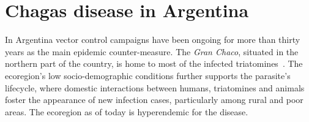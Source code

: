 \section{Chagas disease in Argentina}

In Argentina vector control campaigns have been ongoing for more than thirty years as the main epidemic counter-measure. The \textit{Gran Chaco}, situated in the northern part of the country, is home to most of the infected triatomines~\cite{OPS2014mapa}. The ecoregion's low socio-demographic conditions further supports the parasite's lifecycle, where domestic interactions between humans, triatomines and animals foster the appearance of new infection cases, particularly among rural and poor areas. The ecoregion as of today is hyperendemic for the disease.